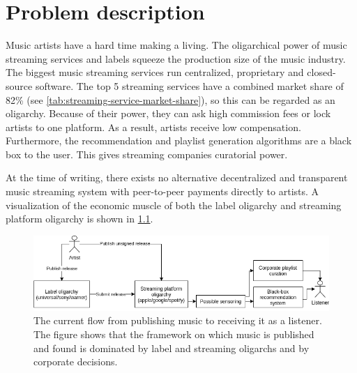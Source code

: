 \chapter{\label{chap:related-work}Problem description}
Music artists have a hard time making a living. The oligarchical power of music streaming services and labels squeeze the production size of the music industry. The biggest music streaming services run centralized, proprietary and closed-source software. The top 5 streaming services have a combined market share of 82\% (see \ref{tab:streaming-service-market-share}), so this can be regarded as an oligarchy. Because of their power, they can ask high commission fees or lock artists to one platform. As a result, artists receive low compensation. Furthermore, the recommendation and playlist generation algorithms are a black box to the user. This gives streaming companies curatorial power. 

At the time of writing, there exists no alternative decentralized and transparent music streaming system with peer-to-peer payments directly to artists. A visualization of the economic muscle of both the label oligarchy and streaming platform oligarchy is shown in \ref{fig:current-music-publishing-situation}.

\begin{figure}
    \centering
    \includegraphics[width=1\linewidth]{problem-description/current-music-publishing-situation.png}
    \caption{The current flow from publishing music to receiving it as a listener. The figure shows that the framework on which music is published and found is dominated by label and streaming oligarchs and by corporate decisions.}
    \label{fig:current-music-publishing-situation}
\end{figure}

